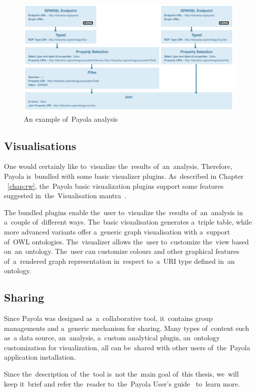 \begin{figure}
	\centering
	\includegraphics[width=150mm]{images/example-analysis.png}
	\caption{An example of~Payola analysis}
	\label{fig:example-analysis}
\end{figure}

\subsection{Visualisations}
One would certainly like to~visualize the~results of~an~analysis. Therefore, 
Payola is~bundled with some basic visualizer plugins. As~described
in Chapter ~\ref{chap:rw}, the~Payola basic visualization 
plugins support some features suggested in~the~Visualisation 
mantra~\cite{mantra}.

The bundled plugins enable the~user to~visualize the~results of~an~analysis 
in a~couple of~different ways. The~basic visualisation generates a~triple 
table, while more advanced variants offer a~generic graph visualisation with a~support of~OWL ontologies. The~visualizer allows the~user to~customize the~view based on~an~ontology. The~user can customize colours and other graphical 
features of~a~rendered graph representation in~respect to~a~URI type defined in~an ontology.

\subsection{Sharing}
Since Payola was designed as~a~collaborative tool, it~contains group 
managements and a~generic mechanism for sharing. Many types of~content such as~a 
data source, an~analysis, a~custom analytical plugin, an~ontology customization for 
visualization, all can be~shared with other users of~the~Payola application 
installation.

Since the~description of~the~tool is~not the~main goal of~this thesis, we~will 
keep it~brief and refer the~reader to~the~Payola User's guide~\cite{payola:ug} to~learn more.

